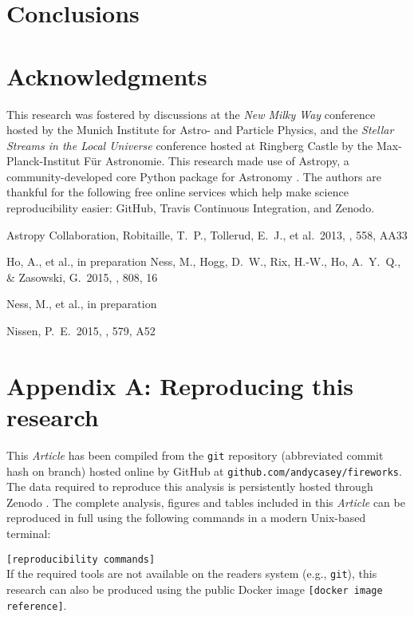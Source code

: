 \documentclass[useAMS,usenatbib]{mn2e}
\newcommand\article{\textit{Article}}
\begin{document}

\section{Conclusions}

% 


\section*{Acknowledgments}
This research was fostered by discussions at the \textit{New Milky Way}
conference hosted by the Munich Institute for Astro- and Particle Physics, and
the \textit{Stellar Streams in the Local Universe} conference hosted at Ringberg
Castle by the Max-Planck-Institut F\"ur Astronomie. This research made use of 
Astropy, a community-developed core Python package for Astronomy \citep{astropy}.
The authors are thankful for the following free online services which help make
science reproducibility easier: GitHub, Travis Continuous Integration, and Zenodo.

\begin{thebibliography}{99}
 Astropy Collaboration, Robitaille, T.~P., Tollerud, E.~J., et al.\ 2013, \aap, 558, AA33

 Ho, A., et al., in preparation
 Ness, M., Hogg, D.~W., Rix, H.-W., Ho, A.~Y.~Q., \& Zasowski, G.\ 2015, \apj, 808, 16 

 Ness, M., et al., in preparation

 Nissen, P.~E.\ 2015, \aap, 579, A52 


\end{thebibliography}


\label{lastpage}

\section{Appendix A: Reproducing this research}
This \article{} has been compiled from the \texttt{git} repository (abbreviated commit hash \texttt{\gitAbbrevHash} on \texttt{\gitBranch} branch) hosted online by GitHub at \texttt{github.com/andycasey/fireworks}. The data required to reproduce this analysis is persistently hosted through Zenodo \citep{DATA}. The complete analysis, figures and tables included in this \article{} can be reproduced in full using the following commands in a modern Unix-based terminal:
\vspace{0.5em}

\noindent\texttt{[reproducibility commands]} 
\vspace{0.5em} \\
If the required tools are not available on the readers system (e.g., \texttt{git}), this research can also be produced using the public Docker image \texttt{[docker image reference]}.
\end{document}
